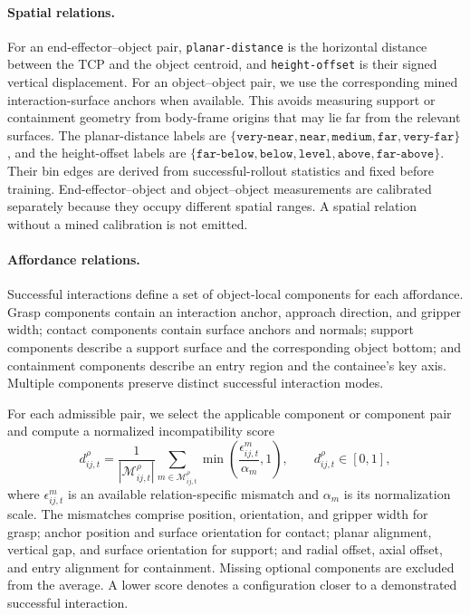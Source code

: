 \paragraph{Spatial relations.}
For an end-effector--object pair, \texttt{planar-distance} is the horizontal
distance between the TCP and the object centroid, and \texttt{height-offset}
is their signed vertical displacement. For an object--object pair, we use the
corresponding mined interaction-surface anchors when available. This avoids
measuring support or containment geometry from body-frame origins that may lie
far from the relevant surfaces. The planar-distance labels are
\(\{\texttt{very-near},\texttt{near},\texttt{medium},\texttt{far},
\texttt{very-far}\}\), and the height-offset labels are
\(\{\texttt{far-below},\texttt{below},\texttt{level},\texttt{above},
\texttt{far-above}\}\). Their bin edges are derived from successful-rollout
statistics and fixed before training. End-effector--object and
object--object measurements are calibrated separately because they occupy
different spatial ranges. A spatial relation without a mined calibration is
not emitted.

\paragraph{Affordance relations.}
Successful interactions define a set of object-local components for each
affordance. Grasp components contain an interaction anchor, approach direction,
and gripper width; contact components contain surface anchors and normals;
support components describe a support surface and the corresponding object
bottom; and containment components describe an entry region and the
containee's key axis. Multiple components preserve distinct successful
interaction modes.

For each admissible pair, we select the applicable component or component pair
and compute a normalized incompatibility score
\begin{equation}
d_{ij,t}^{\rho}
=
\frac{1}{|\mathcal M_{ij,t}^{\rho}|}
\sum_{m\in\mathcal M_{ij,t}^{\rho}}
\min\!\left(\frac{\epsilon_{ij,t}^{m}}{\alpha_m},1\right),
\qquad d_{ij,t}^{\rho}\in[0,1],
\label{eq:affordance_score}
\end{equation}
where \(\epsilon_{ij,t}^{m}\) is an available relation-specific mismatch and
\(\alpha_m\) is its normalization scale. The mismatches comprise position,
orientation, and gripper width for grasp; anchor position and surface
orientation for contact; planar alignment, vertical gap, and surface
orientation for support; and radial offset, axial offset, and entry alignment
for containment. Missing optional components are excluded from the average.
A lower score denotes a configuration closer to a demonstrated successful
interaction.

